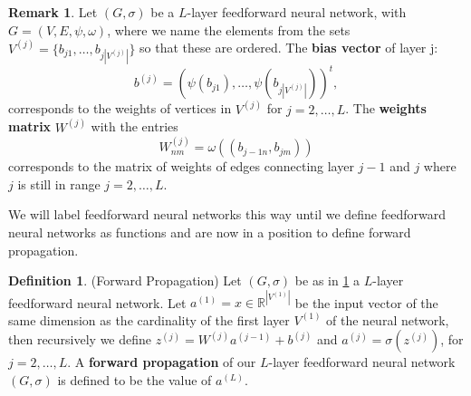 \documentclass{article}
\theoremstyle{definition}
\newtheorem{definition}[theorem]{Definition}
\newtheorem{remark}[theorem]{Remark}
\begin{document}
\begin{remark}\label{standardGraphLabeling}
Let $(G, \sigma)$ be a $L$-layer feedforward neural network, with $G=(V,E,\psi,\omega)$, where we name the elements from the sets $V^{(j)} = \{ b_{j1}, \dots ,b_{j|V^{(j)}|} \}$ so that these are ordered. The \textbf{bias vector} of layer j: 
$$b^{(j)} = (\psi(b_{j1}), \dots ,\psi(b_{j|V^{(j)}|}))^{t},$$ 
corresponds to the weights of vertices in $V^{(j)}$ for $j = 2, \dots , L$. The \textbf{weights matrix} $W^{(j)}$ with the entries 
$$W^{(j)}_{nm} = \omega((b_{j-1n}, b_{jm}))$$ 
corresponds to the matrix of weights of edges connecting layer $j-1$ and $j$ where $j$ is still in range $j = 2, \dots , L$.
\end{remark}

We will label feedforward neural networks this way until we define feedforward neural networks as functions and are now in a position to define forward propagation.

\begin{definition}(Forward Propagation)
\label{def:forward_propagation}
Let $(G, \sigma)$ be as in \ref{standardGraphLabeling} a $L$-layer feedforward neural network. Let $a^{(1)} = x \in \mathbb{R}^{|V^{(1)}|}$ be the input vector of the same dimension as the cardinality of the first layer $V^{(1)}$ of the neural network, then recursively we define $z^{(j)} = W^{(j)} a^{(j-1)} + b^{(j)}$ and $a^{(j)} = \sigma(z^{(j)})$, for $j=2, \dots , L$. A \textbf{forward propagation} of our $L$-layer feedforward neural network $(G, \sigma)$ is defined to be the value of $a^{(L)}$.
\end{definition}
\end{document}
